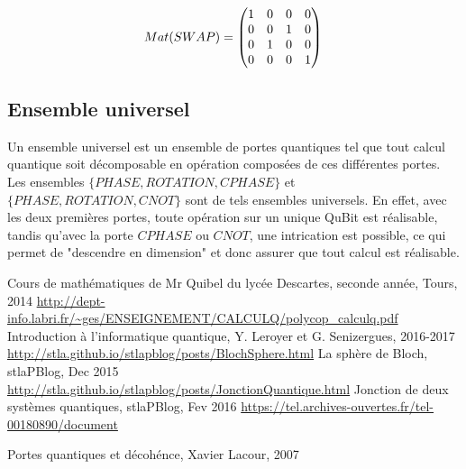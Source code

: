 \documentclass[a4paper,12pt]{report}
\newcommand{\icite}[1]{\up{\textit{\cite{#1}}}}
\begin{document}
\begin{equation}
	 Mat(SWAP) = \left( \begin{matrix} 1 & 0 & 0 & 0 \\ 0 & 0 & 1 & 0 \\ 0 & 1 & 0 & 0 \\ 0 & 0 & 0 & 1 \\ \end{matrix} \right ) \\
\end{equation}

		\subsection{Ensemble universel}

\par{
	Un ensemble universel\icite{ref5} est un ensemble de portes quantiques tel que tout calcul quantique soit décomposable en opération composées de ces différentes portes. Les ensembles $\{PHASE,ROTATION,CPHASE\}$ et $\{PHASE,ROTATION,CNOT\}$ sont de tels ensembles universels. En effet, avec les deux premières portes, toute opération sur un unique QuBit est réalisable, tandis qu'avec la porte $CPHASE$ ou $CNOT$, une intrication est possible, ce qui permet de "descendre en dimension" et donc assurer que tout calcul est réalisable.
}

\begin{thebibliography}{1}
     Cours de mathématiques de Mr Quibel du lycée Descartes, seconde année, Tours, 2014
	 \url{http://dept-info.labri.fr/~ges/ENSEIGNEMENT/CALCULQ/polycop_calculq.pdf} Introduction à l'informatique quantique, Y. Leroyer et G. Senizergues, 2016-2017
	 \url{http://stla.github.io/stlapblog/posts/BlochSphere.html} La sphère de Bloch, stlaPBlog, Dec 2015
	 \url{http://stla.github.io/stlapblog/posts/JonctionQuantique.html} Jonction de deux systèmes quantiques, stlaPBlog, Fev 2016
	 \url{https://tel.archives-ouvertes.fr/tel-00180890/document}
\end{thebibliography} Portes quantiques et décohénce, Xavier Lacour, 2007
\end{document}
